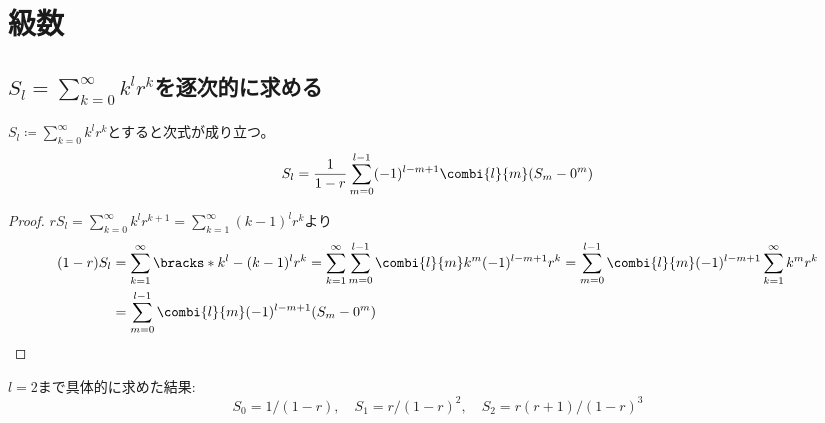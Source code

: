 \chapter{級数}
    \section{\texorpdfstring{$S_l = \sum_{k=0}^\infty k^l r^k$}{A\_l = Σ\_\{k=0\}\string^∞ k\string^l r\string^k}を逐次的に求める}
        \begin{shadebox}
            $S_l \coloneq \sum_{k=0}^\infty k^l r^k$とすると次式が成り立つ。
            \[ S_l = \frac{1}{1-r}\sum_{m=0}^{l-1}(-1)^{l-m+1}\combi{l}{m}(S_m-0^m)\]
        \end{shadebox}
        \begin{proof}
            $rS_l = \sum_{k=0}^\infty k^l r^{k+1} = \sum_{k=1}^\infty (k-1)^l r^k$より
            \begin{align*}
                (1-r)S_l &= \sum_{k=1}^\infty \bracks*{ k^l-(k-1)^l }r^k = \sum_{k=1}^{\infty}\sum_{m=0}^{l-1}\combi{l}{m}k^m(-1)^{l-m+1}r^k = \sum_{m=0}^{l-1}\combi{l}{m}(-1)^{l-m+1}\sum_{k=1}^{\infty}k^m r^k \\
                &= \sum_{m=0}^{l-1}\combi{l}{m}(-1)^{l-m+1}(S_m - 0^m)
            \end{align*}
        \end{proof}
        $l=2$まで具体的に求めた結果:
        \[ S_0 = 1/(1-r),\quad S_1 = r/(1-r)^2,\quad S_2 = r(r+1)/(1-r)^3 \]
